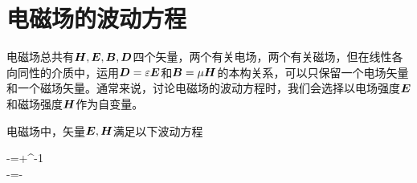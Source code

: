 \section{电磁场的波动方程}
电磁场总共有$\vb*{H},\vb*{E},\vb*{B},\vb*{D}$四个矢量，两个有关电场，两个有关磁场，但在线性各向同性的介质中，运用$\vb*{D}=\varepsilon\vb*{E}$和$\vb*{B}=\mu\vb*{H}$的本构关系，可以只保留一个电场矢量和一个磁场矢量。通常来说，讨论电磁场的波动方程时，我们会选择以电场强度$\vb*{E}$和磁场强度$\vb*{H}$作为自变量。

\begin{BoxEquation}[电磁场的波动方程]
    电磁场中，矢量$\vb*{E},\vb*{H}$满足以下波动方程
    \begin{Gather}[10pt]
        \laplacian{}-\mu\varepsilon{}=\mu{}+\varepsilon^{-1}\grad\rho{}\\
        \laplacian{}-\mu\varepsilon{}=-\curl{}
    \end{Gather}
\end{BoxEquation}
